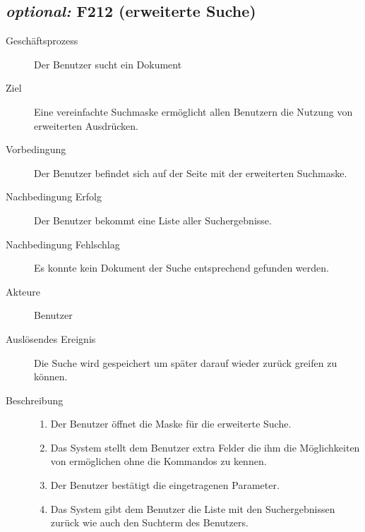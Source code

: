 \subsection{\emph{optional:} F212 (erweiterte Suche)}
\label{F:n00bSuche}
\begin{description}
  \item[Geschäftsprozess]Der Benutzer sucht ein Dokument
  \item[Ziel]Eine vereinfachte Suchmaske ermöglicht allen Benutzern die Nutzung von erweiterten Ausdrücken.
  \item[Vorbedingung]Der Benutzer befindet sich auf der Seite mit der erweiterten Suchmaske.
  \item[Nachbedingung Erfolg]Der Benutzer bekommt eine Liste aller Suchergebnisse.
  \item[Nachbedingung Fehlschlag]Es konnte kein Dokument der Suche entsprechend gefunden werden.
  \item[Akteure]Benutzer
  \item[Auslösendes Ereignis]Die Suche wird gespeichert um später darauf wieder zurück greifen zu können.
  \item[Beschreibung]\hfill
    \begin{enumerate}
      \item Der Benutzer öffnet die Maske für die erweiterte Suche.
      \item Das System stellt dem Benutzer extra Felder die ihm die Möglichkeiten von  ermöglichen ohne die Kommandos zu kennen.
      \item Der Benutzer bestätigt die eingetragenen Parameter.
      \item Das System gibt dem Benutzer die Liste mit den Suchergebnissen zurück wie auch den Suchterm des Benutzers.
    \end{enumerate}
\end{description}


